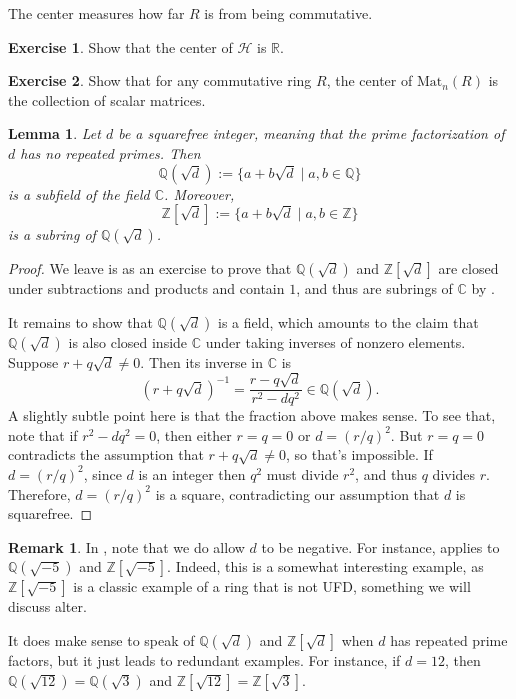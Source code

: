 \documentclass[12pt]{report}
\newtheorem{lemma}[theorem]{Lemma}
\numberwithin{equation}{section}
\numberwithin{theorem}{chapter}
\theoremstyle{definition}
\newtheorem{exercise}{Exercise}
\newtheorem*{basic properties}{Basic Properties}
\newtheorem*{Important Remark}{Important Remark}
\newtheorem{remark}[theorem]{Remark}
\newcommand{\C}{\mathbb{C}}
\begin{document}
The center measures how far $R$ is from being commutative.

\begin{exercise} 
Show that the center of $\mathcal{H}$ is $\mathbb{R}$.	
\end{exercise}

\begin{exercise}
Show that for any commutative ring $R$, the center of $\mathrm{Mat}_{n}(R)$ is the collection of scalar matrices.
\end{exercise}



\begin{lemma}\label{Z sqrt d}
Let $d$ be a squarefree integer, meaning that the prime factorization of $d$ has no repeated primes. Then 
$$\mathbb{Q}(\sqrt {d}) := \{a + b\sqrt{d} \mid a,b \in \mathbb{Q}\}$$ 
is a subfield of the field $\C$. Moreover, 
$$\mathbb{Z}[\sqrt{d}] := \{a + b\sqrt{d} \mid a,b \in \mathbb{Z}\}$$ 
is a subring of $\mathbb{Q}(\sqrt{d})$. 
\end{lemma}


\begin{proof} 
We leave is as an exercise to prove that $\mathbb{Q}(\sqrt {d})$ and $\mathbb{Z}[\sqrt{d}]$ are closed under subtractions and products and contain $1$, and thus are subrings of $\C$ by .

It remains to show that $\mathbb{Q}(\sqrt {d})$ is a field, which amounts to the claim that $\mathbb{Q}(\sqrt {d})$ is also closed inside $\C$ under taking inverses of nonzero elements.
Suppose  $r + q \sqrt{d} \ne 0$. Then its inverse in $\C$ is
$$(r + q \sqrt{d})^{-1} = \frac{r - q \sqrt{d}}{r^2 - d q^2} \in \mathbb{Q}(\sqrt {d}).$$
A slightly subtle point here is that the fraction above makes sense. To see that, note that if $r^2 -d q^2 = 0$, then either $r=q=0$ or $d=(r/q)^2$. But $r=q=0$ contradicts the assumption that $r + q \sqrt{d} \neq 0$, so that's impossible. If $d=(r/q)^2$, since $d$ is an integer then $q^2$ must divide $r^2$, and thus $q$ divides $r$. Therefore, $d = (r/q)^2$ is a square, contradicting our assumption that $d$ is squarefree.
\end{proof}




\begin{remark}
In , note that we do allow $d$ to be negative. For instance,  applies to $\mathbb{Q}(\sqrt{-5})$ and $\mathbb{Z}[\sqrt{-5}]$. Indeed, this is a somewhat interesting example, as $\mathbb{Z}[\sqrt{-5}]$ is a classic example of a ring that is not UFD, something we will discuss alter.

It does make sense to speak of $\mathbb{Q}(\sqrt{d})$ and $\mathbb{Z}[\sqrt{d}]$ when $d$ has repeated prime factors, but it just leads to redundant examples. For instance, if $d = 12$, then $\mathbb{Q}(\sqrt{12}) = \mathbb{Q}(\sqrt{3})$ and $\mathbb{Z}[\sqrt{12}] = \mathbb{Z}[\sqrt{3}]$.	
\end{remark}
\end{document}
